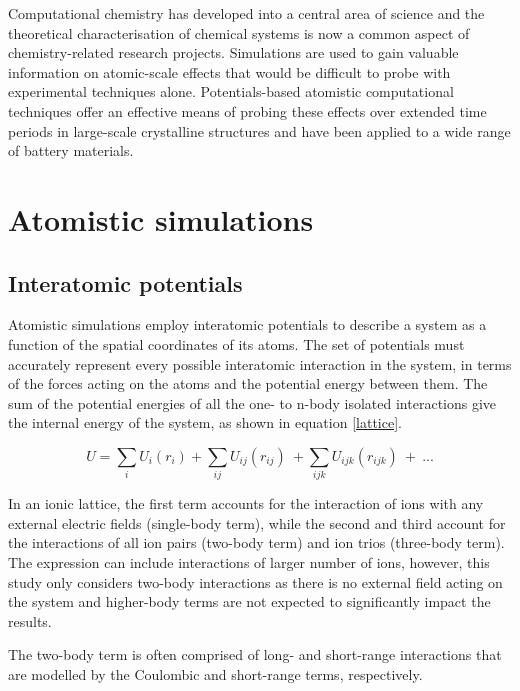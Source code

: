 \documentclass[12pt]{report}
\begin{document}
Computational chemistry has developed into a central area of science and the theoretical characterisation of chemical systems is now a common aspect of chemistry-related research projects.\cite{jensen2017}
Simulations are used to gain valuable information on atomic-scale effects that would be difficult to probe with experimental techniques alone.
Potentials-based atomistic computational techniques offer an effective means of probing these effects over extended time periods in large-scale crystalline structures and have been applied to a wide range of battery materials.

\section{Atomistic simulations}

\subsection{Interatomic potentials}

Atomistic simulations employ interatomic potentials to describe a system as a function of the spatial coordinates of its atoms.
The set of potentials must accurately represent every possible interatomic interaction in the system, in terms of the forces acting on the atoms and the potential energy between them.
The sum of the potential energies of all the one- to n-body isolated interactions give the internal energy of the system, as shown in equation \ref{lattice}.\cite{catlow1997} 

\begin{equation}
    U = \sum_{i} U_{i}(r_{i}) + \sum_{ij} U_{ij}(r_{ij}) \ + \sum_{ijk} U_{ijk}(r_{ijk}) \ + \: ...
\label{lattice}
\end{equation}

\noindent
In an ionic lattice, the first term accounts for the interaction of ions with any external electric fields (single-body term), while the second and third account for the interactions of all ion pairs (two-body term) and ion trios (three-body term).
The expression can include interactions of larger number of ions, however, this study only considers two-body interactions as there is no external field acting on the system and higher-body terms are not expected to significantly impact the results.

The two-body term is often comprised of long- and short-range interactions that are modelled by the Coulombic and short-range terms, respectively. 
\end{document}
